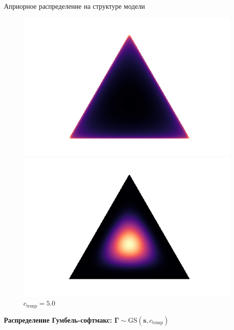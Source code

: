 \documentclass[usenames,dvipsnames,11pt,pdf,utf8,russian,aspectratio=43]{beamer}
\begin{document}
\begin{frame}{Априорное распределение на структуре модели}
\begin{figure}
\begin{minipage}[t]{.3\textwidth}
\begin{tikzpicture}[%
x={(1.7cm,0cm)},
y={(0cm,1.7cm)},
]
\end{tikzpicture}
\caption*{$c_\text{temp}\to0$}
\end{minipage}
\hfill
 \begin{minipage}[t]{.3\textwidth}
   \includegraphics[width=\textwidth]{dir0995.png}
\caption*{$c_\text{temp}=0.995$}
\end{minipage}
\hfill
 \begin{minipage}[t]{.3\textwidth}
   \includegraphics[width=\textwidth]{dir5.png}
\caption*{$c_\text{temp}=5.0$}
\end{minipage}

\end{figure}

\textbf{Распределение Гумбель-софтмакс: }$\boldsymbol{\Gamma}\sim \text{GS}(\mathbf{s}, c_\text{temp})$\\
\begin{figure}
 \begin{minipage}[t]{.3\textwidth}
        \centering
\begin{tikzpicture}[%
x={(1.7cm,0cm)},
y={(0cm,1.7cm)},
]


\end{tikzpicture}
\end{minipage}
\end{figure}
\end{frame}
\end{document}
